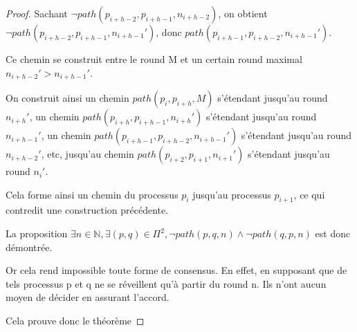 \documentclass{article}
\begin{document}
\begin{proof}
\vspace{0.2cm}

Sachant $\neg path(p_{i+h-2}, p_{i+h-1}, n_{i+h-2})$,
on obtient $\neg path(p_{i+h-2}, p_{i+h-1}, n_{i+h-1}')$,
donc $path(p_{i+h-1}, p_{i+h-2}, n_{i+h-1}')$.

Ce chemin se construit entre le round M et un certain round maximal $n_{i+h-2}' > n_{i+h-1}'$.

\vspace{0.2cm}

On construit ainsi 
un chemin $path(p_{i}, p_{i+h}, M)$ s'étendant jusqu'au round $n_{i+h}'$,
un chemin $path(p_{i+h}, p_{i+h-1}, n_{i+h}')$ s'étendant jusqu'au round $n_{i+h-1}'$,
un chemin $path(p_{i+h-1}, p_{i+h-2}, n_{i+h-1}')$ s'étendant jusqu'au round $n_{i+h-2}'$,
etc, jusqu'au chemin $path(p_{i+2}, p_{i+1}, n_{i+1}')$ s'étendant jusqu'au round $n_{i}'$.

Cela forme ainsi un chemin du processus $p_i$ jusqu'au processus $p_{i+1}$, ce qui contredit 
une construction précédente.

\vspace{0.5cm}

La proposition 
$\exists n \in \mathds{N}, \exists (p, q) \in \Pi^2, \neg path(p,q, n) \wedge \neg path(q,p,n)$
est donc démontrée.

Or cela rend impossible toute forme de consensus. En effet, en supposant que de tels processus p et q ne se réveillent qu'à partir du round n. Ils n'ont aucun moyen de décider en assurant l'accord.

Cela prouve donc le théorème

\end{proof}
\end{document}
